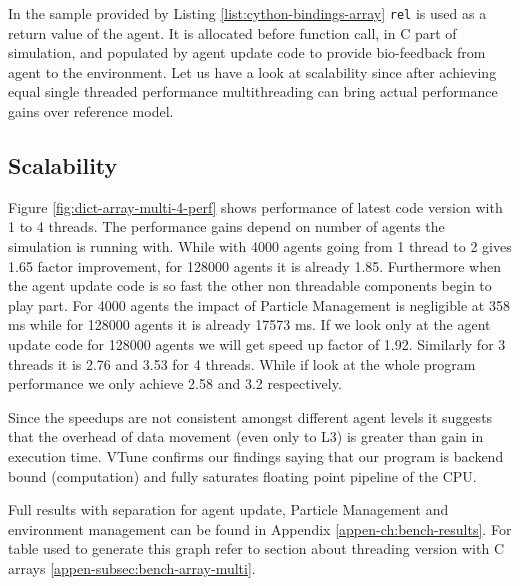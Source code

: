 \documentclass[12pt, a4paper]{report}
\begin{document}
In the sample provided by Listing \ref{list:cython-bindings-array}
\lstinline{rel} is used as a return value of the agent. It is allocated before
function call, in C part of simulation, and populated by agent update code to
provide bio-feedback from agent to the environment. Let us have a look at scalability
since after achieving equal single threaded performance multithreading can bring
actual performance gains over reference model.

\subsection{Scalability}\label{subsec:embed-array-scala}
Figure \ref{fig:dict-array-multi-4-perf} shows performance of latest code version
with 1 to 4 threads. The performance gains depend on number of agents the simulation
is running with. While with 4000 agents going from 1 thread to 2 gives 1.65 factor
improvement, for 128000 agents it is already 1.85. Furthermore when the agent update
code is so fast the other non threadable components begin to play part. For 4000 agents
the impact of Particle Management is negligible at 358 ms while for 128000 agents it
is already 17573 ms. If we look only at the agent update code for 128000 agents we
will get speed up factor of 1.92. Similarly for 3 threads it is 2.76 and 3.53 for 4
threads. While if look at the whole program performance we only achieve 2.58 and 3.2 respectively.

Since the speedups are not consistent amongst different agent levels it suggests that
the overhead of data movement (even only to L3) is greater than gain in execution time.
VTune confirms our findings saying that our program is backend bound (computation) and
fully saturates floating point pipeline of the CPU.

Full results with separation for agent update, Particle Management and environment management
can be found in Appendix \ref{appen-ch:bench-results}. For table used to generate this graph refer
to section about threading version with C arrays \ref{appen-subsec:bench-array-multi}.
\end{document}
